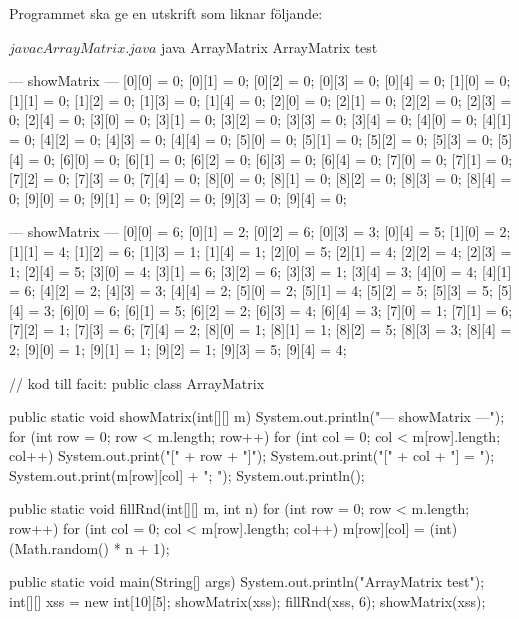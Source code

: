 Programmet ska ge en utskrift som liknar följande:
\begin{REPL}
$ javac ArrayMatrix.java 
$ java ArrayMatrix 
ArrayMatrix test

--- showMatrix ---
[0][0] = 0; [0][1] = 0; [0][2] = 0; [0][3] = 0; [0][4] = 0; 
[1][0] = 0; [1][1] = 0; [1][2] = 0; [1][3] = 0; [1][4] = 0; 
[2][0] = 0; [2][1] = 0; [2][2] = 0; [2][3] = 0; [2][4] = 0; 
[3][0] = 0; [3][1] = 0; [3][2] = 0; [3][3] = 0; [3][4] = 0; 
[4][0] = 0; [4][1] = 0; [4][2] = 0; [4][3] = 0; [4][4] = 0; 
[5][0] = 0; [5][1] = 0; [5][2] = 0; [5][3] = 0; [5][4] = 0; 
[6][0] = 0; [6][1] = 0; [6][2] = 0; [6][3] = 0; [6][4] = 0; 
[7][0] = 0; [7][1] = 0; [7][2] = 0; [7][3] = 0; [7][4] = 0; 
[8][0] = 0; [8][1] = 0; [8][2] = 0; [8][3] = 0; [8][4] = 0; 
[9][0] = 0; [9][1] = 0; [9][2] = 0; [9][3] = 0; [9][4] = 0; 

--- showMatrix ---
[0][0] = 6; [0][1] = 2; [0][2] = 6; [0][3] = 3; [0][4] = 5; 
[1][0] = 2; [1][1] = 4; [1][2] = 6; [1][3] = 1; [1][4] = 1; 
[2][0] = 5; [2][1] = 4; [2][2] = 4; [2][3] = 1; [2][4] = 5; 
[3][0] = 4; [3][1] = 6; [3][2] = 6; [3][3] = 1; [3][4] = 3; 
[4][0] = 4; [4][1] = 6; [4][2] = 2; [4][3] = 3; [4][4] = 2; 
[5][0] = 2; [5][1] = 4; [5][2] = 5; [5][3] = 5; [5][4] = 3; 
[6][0] = 6; [6][1] = 5; [6][2] = 2; [6][3] = 4; [6][4] = 3; 
[7][0] = 1; [7][1] = 6; [7][2] = 1; [7][3] = 6; [7][4] = 2; 
[8][0] = 1; [8][1] = 1; [8][2] = 5; [8][3] = 3; [8][4] = 2; 
[9][0] = 1; [9][1] = 1; [9][2] = 1; [9][3] = 5; [9][4] = 4; 

\end{REPL}

 

\begin{Code}[language=Java]
// kod till facit:
public class ArrayMatrix {

    public static void showMatrix(int[][] m){
        System.out.println("\n--- showMatrix ---");
        for (int row = 0; row < m.length; row++){
            for (int col = 0; col < m[row].length; col++) {
                System.out.print("[" + row + "]");
                System.out.print("[" + col + "] = ");
                System.out.print(m[row][col] + "; ");
            }
            System.out.println();
        }
    }
    
    public static void fillRnd(int[][] m, int n){
        for (int row = 0; row < m.length; row++){
            for (int col = 0; col < m[row].length; col++) {
              m[row][col] = (int) (Math.random() * n + 1);
            }
        }
    }

    public static void main(String[] args) {
        System.out.println("ArrayMatrix test");
        int[][] xss = new int[10][5];
        showMatrix(xss);
        fillRnd(xss, 6);
        showMatrix(xss);
    }
}
\end{Code}




